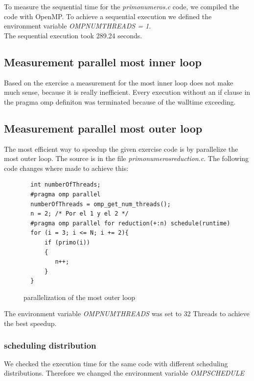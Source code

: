 \documentclass[11pt,a4paper]{article}
\begin{document}
To measure the sequential time for the 
\textit{primo\textunderscore numeros\textunderscore .c} code, we compiled the code with OpenMP. To achieve a sequential execution we defined the environment variable
\textit{OMP\textunderscore NUM\textunderscore THREADS = 1}. \\
The sequential execution took 289.24 seconds.


\subsection{Measurement parallel most inner loop}

Based on the exercise a measurement for the most inner loop does not make much sense, because it is really inefficient. Every execution without an if clause in the pragma omp definiton was terminated because of the walltime exceeding.

\subsection{Measurement parallel most outer loop}

The most efficient way to speedup the given exercise code is by parallelize the most outer loop. 
The source is in the file \textit{primo\textunderscore numeros\textunderscore reduction.c}.
The following code changes where made to achieve this:

\begin{figure}[h]
\label{code_mostouterloop}
\begin{lstlisting}
  int numberOfThreads;
  #pragma omp parallel
  numberOfThreads = omp_get_num_threads();
  n = 2; /* Por el 1 y el 2 */
  #pragma omp parallel for reduction(+:n) schedule(runtime)
  for (i = 3; i <= N; i += 2){
      if (primo(i))
      {
         n++;
      }
  }
\end{lstlisting} 
\caption{parallelization of the most outer loop}
\end{figure} 

The environment variable \textit{OMP\textunderscore NUM\textunderscore THREADS} was set to 32 Threads to achieve the best speedup.\\

\subsubsection{scheduling distribution}

We checked the execution time for the same code with different scheduling distributions. Therefore we changed the environment variable \textit{OMP\textunderscore SCHEDULE}
\end{document}

